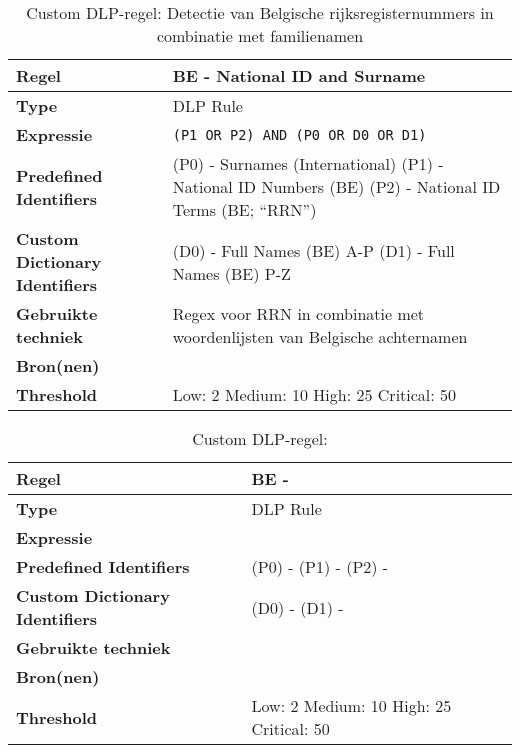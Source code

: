 \begin{table}[h]
    \centering
    \small
    \scriptsize
    \begin{tabular}{p{4cm} p{10cm}}
        \toprule
        \textbf{Regel} & BE - National ID and Surname \\
        \midrule
        \textbf{Type} & DLP Rule \\
        \textbf{Expressie} & \texttt{(P1 OR P2) AND (P0 OR D0 OR D1)} \\
        \textbf{Predefined Identifiers} & 
        (P0) - Surnames (International) \newline
        (P1) - National ID Numbers (BE) \newline
        (P2) - National ID Terms (BE; “RRN”) \\
        \textbf{Custom Dictionary Identifiers} & 
        (D0) - Full Names (BE) A-P \newline
        (D1) - Full Names (BE) P-Z \\
        \textbf{Gebruikte techniek} & Regex voor RRN in combinatie met woordenlijsten van Belgische achternamen \\
        \textbf{Bron(nen)} & \textcite{Statbel2023, Statbel2024} \\
        \textbf{Threshold} & Low: 2 \quad Medium: 10 \quad High: 25 \quad Critical: 50 \\
        \bottomrule
    \end{tabular}
    \caption{Custom DLP-regel: Detectie van Belgische rijksregisternummers in combinatie met familienamen}
    \label{tab:custom-be-id}
\end{table}



\begin{table}[h]
    \centering
    \small
    \scriptsize
    \begin{tabular}{p{4cm} p{10cm}}
        \toprule
        \textbf{Regel} & BE -  \\
        \midrule
        \textbf{Type} & DLP Rule \\
        \textbf{Expressie} & \texttt{} \\
        \textbf{Predefined Identifiers} & 
        (P0) - \newline
        (P1) - \newline
        (P2) -  \\
        \textbf{Custom Dictionary Identifiers} & 
        (D0) - \newline
        (D1) - \\
        \textbf{Gebruikte techniek} & \\
        \textbf{Bron(nen)} & \textcite{} \\
        \textbf{Threshold} & Low: 2 \quad Medium: 10 \quad High: 25 \quad Critical: 50 \\
        \bottomrule
    \end{tabular}
    \caption{Custom DLP-regel: }
    \label{tab:custom-}
\end{table}


